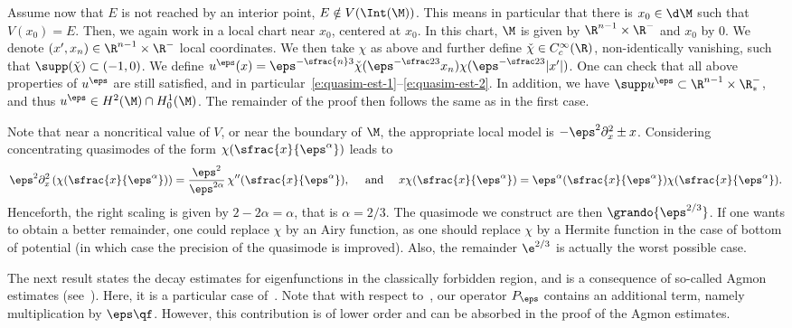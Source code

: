 Assume now that $E$ is not reached by an interior point, \ie $E \notin V(\Int(\M))$. This means in particular that
there is $x_0 \in \d\M$ such that $V(x_0) = E$.
Then, we again work in a local chart near $x_0$, centered at $x_0$. In this chart, $\M$ is given by $\R^{n-1}\times\R^-$ and $x_0$ by $0$. We denote $(x', x_n) \in \R^{n-1}\times\R^-$ local coordinates.
We then take $\chi$ as above and further define $\check{\chi} \in C^\infty_c(\R)$, non-identically vanishing, such that $\supp(\check{\chi}) \subset (-1,0)$. We define $u^\eps (x) = \eps^{-\sfrac{n}3}\check{\chi}(\eps^{-\sfrac23} x_n) \chi ( \eps^{-\sfrac23} |x'| )$. One can check that all above properties of $u^\eps$ are still satisfied, and in particular~\eqref{e:quasim-est-1}--\eqref{e:quasim-est-2}.
In addition, we have $\supp u^\eps \subset \R^{n-1}\times\R^-_*$, and thus $u^\eps \in H^2(\M) \cap H^1_0(\M)$. The remainder of the proof then follows the same as in the first case.
\enp

\begin{remark}
Note that near a noncritical value of $V$, or near the boundary of $\M$, the appropriate local model is $-\eps^2\partial_x^2\pm x$. Considering concentrating quasimodes of the form $\chi(\sfrac{x}{\eps^{\alpha}})$ leads to
\[
\eps^2\partial_x^2\left( \chi(\sfrac{x}{\eps^{\alpha}})\right)=\frac{\eps^2}{\eps^{2\alpha}}\,\chi''(\sfrac{x}{\eps^{\alpha}}),
\quad \text{ and } \quad
x\chi(\sfrac{x}{\eps^{\alpha}})=\eps^{\alpha}(\sfrac{x}{\eps^{\alpha}})\chi(\sfrac{x}{\eps^{\alpha}}).
\]
Henceforth, the right scaling is given by $2-2\alpha =\alpha$, that is $\alpha=2/3$.
The quasimode we construct are then $\grando{\eps^{2/3}}$. If one wants to obtain a better remainder, one could replace $\chi$ by an Airy function, as one should replace $\chi$ by a Hermite function in the case of bottom of potential (in which case the precision of the quasimode is improved). Also, the remainder $\e^{2/3}$ is actually the worst possible case.
\end{remark}

The next result states the decay estimates for eigenfunctions in the classically forbidden region, and is a consequence of so-called Agmon estimates (see~\cite{HS84,Helffer:booksemiclassic,DS:book}). Here, it is a particular case of~\cite[Prop.\,3.3.1 \&~3.3.4]{Helffer:booksemiclassic}. Note that with respect to~\cite[Prop.\,3.3.1]{Helffer:booksemiclassic}, our operator $P_\eps$ contains an additional term, namely multiplication by $\eps \qf$. However, this contribution is of lower order and can be absorbed in the proof of the Agmon estimates.

